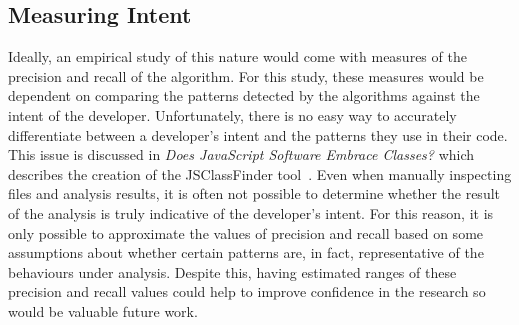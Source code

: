 \subsection{Measuring Intent}
Ideally, an empirical study of this nature would come with measures of the precision and recall of the algorithm. For this study, these measures would be dependent on comparing the patterns detected by the algorithms against the intent of the developer. Unfortunately, there is no easy way to accurately differentiate between a developer's intent and the patterns they use in their code. This issue is discussed in \textit{Does JavaScript Software Embrace Classes?} which describes the creation of the JSClassFinder tool~\cite{JSClassFinder}. Even when manually inspecting files and analysis results, it is often not possible to determine whether the result of the analysis is truly indicative of the developer's intent. For this reason, it is only possible to approximate the values of precision and recall based on some assumptions about whether certain patterns are, in fact, representative of the behaviours under analysis. Despite this, having estimated ranges of these precision and recall values could help to improve confidence in the research so would be valuable future work.